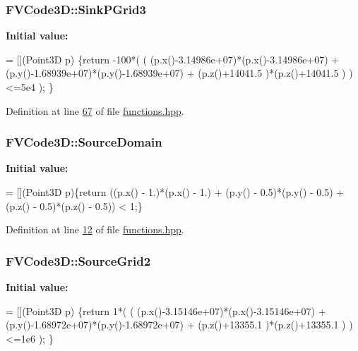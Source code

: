 \subsubsection[{\texorpdfstring{Sink\+P\+Grid3}{SinkPGrid3}}]{ F\+V\+Code3\+D\+::\+Sink\+P\+Grid3}\hypertarget{namespaceFVCode3D_a8e5a12e6a9e22baa4378e82fdfcc7613}{}\label{namespaceFVCode3D_a8e5a12e6a9e22baa4378e82fdfcc7613}
{\bfseries Initial value\+:}
\begin{DoxyCode}
= [](Point3D p)
    \{\textcolor{keywordflow}{return} -100*( (
                     (p.x()-3.14986e+07)*(p.x()-3.14986e+07) +
                     (p.y()-1.68939e+07)*(p.y()-1.68939e+07) +
                     (p.z()+14041.5    )*(p.z()+14041.5    )
                   ) <=5e4
                 );
    \}
\end{DoxyCode}


Definition at line \hyperlink{functions_8hpp_source_l00067}{67} of file \hyperlink{functions_8hpp_source}{functions.\+hpp}.

\subsubsection[{\texorpdfstring{Source\+Domain}{SourceDomain}}]{ F\+V\+Code3\+D\+::\+Source\+Domain}\hypertarget{namespaceFVCode3D_ae98a1f1ab0fce8db57176a4a9f91b2d0}{}\label{namespaceFVCode3D_ae98a1f1ab0fce8db57176a4a9f91b2d0}
{\bfseries Initial value\+:}
\begin{DoxyCode}
= [](Point3D p)\{\textcolor{keywordflow}{return} ((p.x() - 1.)*(p.x() - 1.) + (p.y() - 0.5)*(p.y() - 0.5) + (p.z() - 0.5)*(p.z()
- 0.5)) < 1;\}
\end{DoxyCode}


Definition at line \hyperlink{functions_8hpp_source_l00012}{12} of file \hyperlink{functions_8hpp_source}{functions.\+hpp}.

\subsubsection[{\texorpdfstring{Source\+Grid2}{SourceGrid2}}]{ F\+V\+Code3\+D\+::\+Source\+Grid2}\hypertarget{namespaceFVCode3D_a271b4cbc8ec56bd2a3cb950b307aef18}{}\label{namespaceFVCode3D_a271b4cbc8ec56bd2a3cb950b307aef18}
{\bfseries Initial value\+:}
\begin{DoxyCode}
= [](Point3D p)
    \{\textcolor{keywordflow}{return} 1*( (
                    (p.x()-3.15146e+07)*(p.x()-3.15146e+07) +
                    (p.y()-1.68972e+07)*(p.y()-1.68972e+07) +
                    (p.z()+13355.1    )*(p.z()+13355.1    )
                  ) <=1e6
                );
    \}
\end{DoxyCode}


